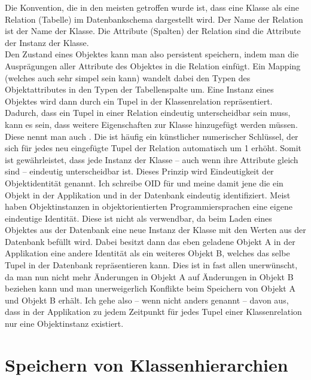 Die Konvention, die in den meisten  getroffen wurde ist, dass eine Klasse als eine Relation (Tabelle) im Datenbankschema dargestellt wird. Der Name der Relation ist der Name der Klasse. Die Attribute (Spalten) der Relation sind die Attribute der Instanz der Klasse. \\
Den Zustand eines Objektes kann man also persistent speichern, indem man die Ausprägungen aller Attribute des Objektes in die Relation einfügt. Ein Mapping (welches auch sehr simpel sein kann) wandelt dabei den Typen des Ob\-jekt\-attri\-but\-es in den Typen der Tabellenspalte um. Eine Instanz eines Objektes wird dann durch ein Tupel in der Klassenrelation repräsentiert. \\
Dadurch, dass ein Tupel in einer Relation eindeutig unterscheidbar sein muss, kann es sein, dass weitere Eigenschaften zur Klasse hinzugefügt werden müssen. Diese nennt man auch . Die  ist häufig ein künstlicher numerischer Schlüssel, der sich für jedes neu eingefügte Tupel der Relation automatisch um 1 erhöht. Somit ist gewährleistet, dass jede Instanz der Klasse -- auch wenn ihre Attribute gleich sind -- eindeutig unterscheidbar ist. Dieses Prinzip wird Eindeutigkeit der Objektidentität genannt. Ich schreibe OID für  und meine damit jene  die ein Objekt in der Applikation und in der Datenbank eindeutig identifiziert. Meist haben Objektinstanzen in objektorientierten Programmiersprachen eine eigene eindeutige Identität. Diese ist nicht als  verwendbar, da beim Laden eines Objektes aus der Datenbank eine neue Instanz der Klasse mit den Werten aus der Datenbank befüllt wird. Dabei besitzt dann das eben geladene Objekt A in der Applikation eine andere Identität als ein weiteres Objekt B, welches das selbe Tupel in der Datenbank repräsentieren kann. Dies ist in fast allen  unerwünscht, da man nun nicht mehr Änderungen in Objekt A auf Änderungen in Objekt B beziehen kann und man unerweigerlich Konflikte beim Speichern von Objekt A und Objekt B erhält. Ich gehe also -- wenn nicht anders genannt -- davon aus, dass in der Applikation zu jedem Zeitpunkt für jedes Tupel einer Klassenrelation nur eine Objektinstanz existiert.

\section{Speichern von Klassenhierarchien}

